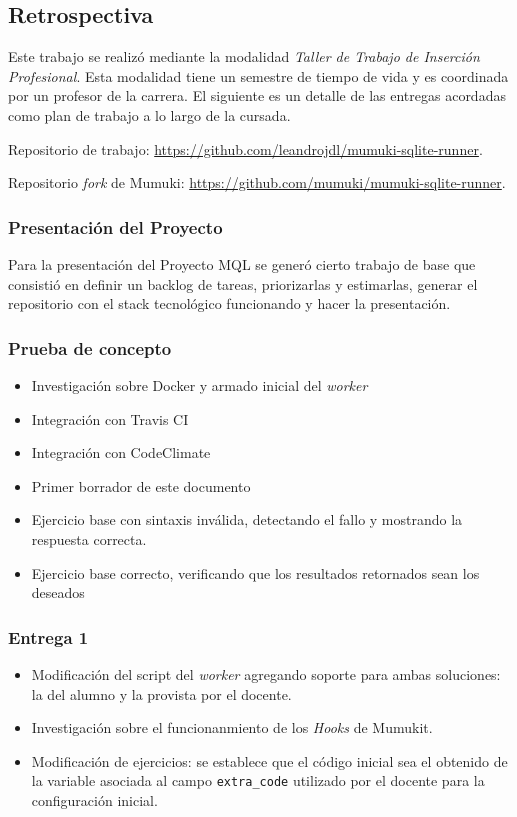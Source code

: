 \subsection{Retrospectiva}

Este trabajo se realizó mediante la modalidad
\textit{Taller de Trabajo de Inserción Profesional}.
Esta modalidad tiene un semestre de tiempo de vida
y es coordinada por un profesor de la carrera.
El siguiente es un detalle de las entregas acordadas
como plan de trabajo a lo largo de la cursada.

Repositorio de trabajo: \url{https://github.com/leandrojdl/mumuki-sqlite-runner}.

Repositorio \textit{fork} de Mumuki: \url{https://github.com/mumuki/mumuki-sqlite-runner}.

\subsubsection{Presentación del Proyecto}

Para la presentación del Proyecto MQL se generó cierto
trabajo de base que consistió en definir un backlog de tareas,
priorizarlas y estimarlas, generar el repositorio con
el stack tecnológico funcionando y hacer la presentación.

\subsubsection{Prueba de concepto}

\begin{itemize}
    \item Investigación sobre Docker y armado inicial del \textit{worker}
    \item Integración con Travis CI
    \item Integración con CodeClimate
    \item Primer borrador de este documento
    \item Ejercicio base con sintaxis inválida, detectando el fallo
          y mostrando la respuesta correcta.
    \item Ejercicio base correcto, verificando que los
          resultados retornados sean los deseados
\end{itemize}

\subsubsection{Entrega 1}

\begin{itemize}
    \item Modificación del script del \textit{worker} agregando soporte
    para ambas soluciones: la del alumno y la provista por el docente.
    \item Investigación sobre el funcionanmiento de los \textit{Hooks} de Mumukit.
    \item Modificación de ejercicios: se establece que el código inicial
    sea el obtenido de la variable asociada al campo \texttt{extra\_code}
    utilizado por el docente para la configuración inicial.
\end{itemize}

